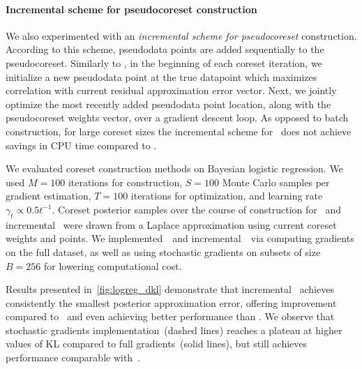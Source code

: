 \paragraph{Incremental scheme for pseudocoreset construction} We also experimented with an \emph{incremental scheme for pseudocoreset} construction. According to this scheme, pseudodata points are added sequentially to the pseudocoreset. Similarly to \sparsevi, in the beginning of each coreset iteration, we initialize a new pseudodata point at the true datapoint which maximizes correlation with current residual approximation error vector. Next, we jointly optimize the most recently added pseudodata point location, along with the pseudocoreset weights vector, over a gradient descent loop.  As opposed to batch construction, for large coreset sizes the incremental scheme for \psvi~does not achieve savings in CPU time compared to \sparsevi.

We evaluated coreset construction methods on Bayesian logistic regression. We used $M=100$ iterations for construction, $ S=100 $ Monte Carlo samples per gradient estimation, $ T= 100$ iterations for optimization, and learning rate $\gamma_t \propto 0.5t^{-1}$. Coreset posterior samples over the course of construction
for \sparsevi~and incremental \psvi~were drawn from a Laplace approximation using current
coreset weights and points. We implemented~\sparsevi~and incremental~\psvi~via computing gradients on the full dataset, as well as using stochastic gradients on subsets of size $B=256$ for lowering computational cost. 

 Results presented in~\cref{fig:logreg_dkl} demonstrate that incremental \psvi~achieves consistently the smallest posterior approximation error, offering improvement
compared to \sparsevi~and even achieving better performance than \gigao. %
 We observe that stochastic gradients implementation~(dashed lines) reaches a plateau at higher values of KL compared to full gradients~(solid lines), but still achieves performance comparable with~\gigao.







